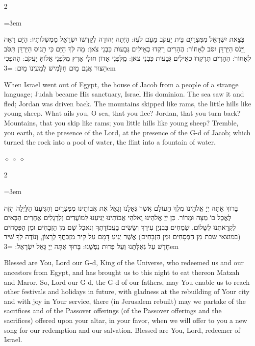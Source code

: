 \documentclass[11pt, openany]{book}
\newenvironment{bilingual}{%
  \par\vspace{4pt}%
  \begin{paracol}{2}%
}{%
  \end{paracol}%
  \par\vspace{2pt}%
}
\newenvironment{hebrewcol}{%
  \switchcolumn[1]%
  \begingroup
  \RTL
  \hebrewfont\large
  \setstretch{1.4}%
  \emergencystretch=3em
  \tolerance=9999
  \parindent=0pt\relax
}{%
  \endRTL
  \endgroup
}
\newenvironment{englishcol}{%
  \switchcolumn[0]%
  \begingroup
  \setstretch{1.4}%
  \emergencystretch=3em
  \tolerance=9999
  \normalsize
  \rightskip=0.12in\relax
}{%
  \endgroup
}
\newcommand{\parasep}{%
  \par\vspace{3pt}
  \begin{center}
    \textcolor{sedergold!50}{\tiny$\diamond\;\diamond\;\diamond$}
  \end{center}
  \par\vspace{3pt}
}
\begin{document}
\begin{bilingual}
\begin{hebrewcol}
בְּצֵאת יִשְׂרָאֵל מִמִּצְרָיִִם בֵּית יַעֲקֹב מֵעַם לֹעֵז: הָיְתָה יְהוּדָה לְקָדְשׁוֹ יִשְׂרָאֵל מַמְשְׁלוֹתָיו: הַיָּם רָאָה וַיָּנֹס הַיַּרְדֵּן יִסֹּב לְאָחוֹר: הֶהָרִים רָקְדוּ כְאֵילִים גְּבָעוֹת כִּבְנֵי צֹאן: מַה לְּךָ הַיָּם כִּי תָנוּס הַיַּרְדֵּן תִּסֹּב לְאָחוֹר: הֶהָרִים תִּרְקְדוּ כְאֵילִים גְּבָעוֹת כִּבְנֵי צֹאן: מִִלִּפְנֵי אָדוֹן חוּלִי אָרֶץ מִלִּפְנֵי אֱלוֹהַּ יַעֲקֹב: הַהֹפְכִי הַצּוּר אֲגַם מָיִם חַלָּמִישׁ לְמַעְיְנוֹ מָיִם:
\end{hebrewcol}
\begin{englishcol}
When Israel went out of Egypt, the house of Jacob from a people of a strange language; Judah became His sanctuary, Israel His dominion. The sea saw it and fled; Jordan was driven back. The mountains skipped like rams, the little hills like young sheep. What ails you, O sea, that you flee? Jordan, that you turn back? Mountains, that you skip like rams; you little hills like young sheep? Tremble, you earth, at the presence of the Lord, at the presence of the G-d of Jacob; which turned the rock into a pool of water, the flint into a fountain of water.
\end{englishcol}
\end{bilingual}
\parasep

\begin{bilingual}
\begin{hebrewcol}
בָּרוּךְ אַתָּה יְיָ אֱלֹהֵינוּ מֶלֶךְ הָעוֹלָם אֲשֶׁר גְּאָלָנוּ וְגָאַל אֶת אֲבוֹתֵינוּ מִמִּצְרַיִם וְהִגִּיעָנוּ הַלַּיְלָה הַזֶּה לֶאֱכָל בּוֹ מַצָּה וּמָרוֹר. כֵּן יְיָ אֱלֹהֵינוּ וֵאלֹהֵי אֲבוֹתֵינוּ יַגִּיעֵנוּ לְמוֹעֲדִים וְלִרְגָלִים אֲחֵרִים הַבָּאִים לִקְרָאתֵנוּ לְשָׁלוֹם, שְׂמֵחִים בְּבִנְיַן עִירֶךָ וְשָׂשִׂים בַּעֲבוֹדָתֶךָ וְנֹאכַל שָׁם מִן הַזְּבָחִים וּמִן הַפְּסָחִים (במוצאי שבת מִן הַפְּסָחִים וּמִן הַזְבָחִים) אֲשֶׁר יַגִּיעַ דָּמָם עַל קִיר מִזְבַּחֲךָ לְרָצוֹן, וְנוֹדֶה לְּךָ שִׁיר חָדָשׁ עַל גְּאֻלָּתֵנוּ וְעַל פְּדוּת נַפְשֵׁנוּ: בָּרוּךְ אַתָּה יְיָ גָּאַל יִשְׂרָאֵל:
\end{hebrewcol}
\begin{englishcol}
Blessed are You, Lord our G-d, King of the Universe, who redeemed us and our ancestors from Egypt, and has brought us to this night to eat thereon Matzah and Maror. So, Lord our G-d, the G-d of our fathers, may You enable us to reach other festivals and holidays in future, with gladness at the rebuilding of Your city and with joy in Your service, there (in Jerusalem rebuilt) may we partake of the sacrifices and of the Passover offerings (of the Passover offerings and the sacrifices) offered upon your altar, in your favor, when we will offer to you a new song for our redemption and our salvation. Blessed are You, Lord, redeemer of Israel.
\end{englishcol}
\end{bilingual}
\end{document}
